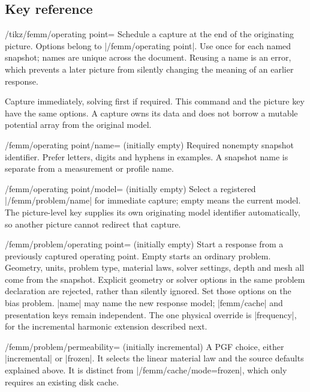 \subsection{Key reference}
\begin{key}{/tikz/femm/operating point=}
Schedule a capture at the end of the originating picture. Options belong to
|/femm/operating point|. Use once for each named snapshot; names are
unique across the document. Reusing a name is an error, which prevents a
later picture from silently changing the meaning of an earlier response.
\end{key}
\begin{command}{\femmoperatingpoint{}}
Capture immediately, solving first if required. This command and the picture
key have the same options. A capture owns its data and does not borrow a
mutable potential array from the original model.
\end{command}
\begin{key}{/femm/operating point/name= (initially empty)}
Required nonempty snapshot identifier. Prefer letters, digits and hyphens in
examples. A snapshot name is separate from a measurement or profile name.
\end{key}
\begin{key}{/femm/operating point/model= (initially empty)}
Select a registered |/femm/problem/name| for immediate capture; empty means
the current model. The picture-level key supplies its own originating model
identifier automatically, so another picture cannot redirect that capture.
\end{key}
\begin{key}{/femm/problem/operating point= (initially empty)}
Start a response from a previously captured operating point. Empty starts an
ordinary problem. Geometry, units, problem type, material laws, solver settings,
depth and mesh all come from the snapshot. Explicit geometry or solver options
in the same problem declaration are rejected, rather than silently ignored.
Set those options on the bias problem. |name| may name the new response model;
|femm/cache| and presentation keys remain independent. The one physical override
is |frequency|, for the incremental harmonic extension described next.
\end{key}
\begin{key}{/femm/problem/permeability= (initially incremental)}
A PGF choice, either |incremental| or |frozen|. It selects the linear material
law and the source defaults explained above. It is distinct from
|/femm/cache/mode=frozen|, which only requires an existing disk cache.
\end{key}
